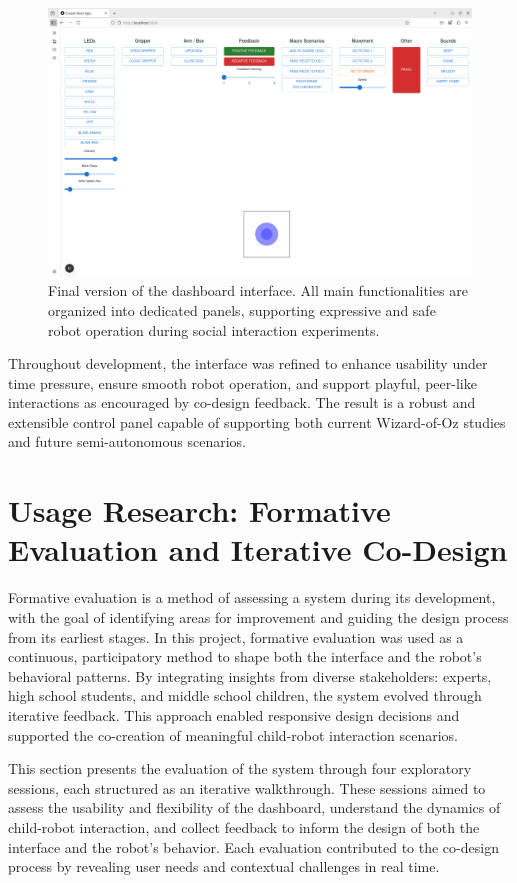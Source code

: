 \documentclass[a4paper]{usiinfbachelorproject}
\begin{document}
\begin{figure}[H]
    \centering
    \includegraphics[width=\linewidth]{figures/dashboard_v3.png}
    \caption{Final version of the dashboard interface. All main functionalities are organized into dedicated panels, supporting expressive and safe robot operation during social interaction experiments.}
    \label{fig:dashboard-v3-desc}
\end{figure}

Throughout development, the interface was refined to enhance usability under time pressure, ensure smooth robot operation, and support playful, peer-like interactions as encouraged by co-design feedback.
The result is a robust and extensible control panel capable of supporting both current Wizard-of-Oz studies and future semi-autonomous scenarios.

\section{\textbf{Usage Research: Formative Evaluation and Iterative Co-Design}}\label{sec:evaluation}
Formative evaluation is a method of assessing a system during its development, with the goal of identifying areas for improvement and guiding the design process from its earliest stages.
In this project, formative evaluation was used as a continuous, participatory method to shape both the interface and the robot's behavioral patterns.
By integrating insights from diverse stakeholders: experts, high school students, and middle school children, the system evolved through iterative feedback.
This approach enabled responsive design decisions and supported the co-creation of meaningful child-robot interaction scenarios.

This section presents the evaluation of the system through four exploratory sessions, each structured as an iterative walkthrough.
These sessions aimed to assess the usability and flexibility of the dashboard, understand the dynamics of child-robot interaction, and collect feedback to inform the design of both the interface and the robot's behavior.
Each evaluation contributed to the co-design process by revealing user needs and contextual challenges in real time.
\end{document}
